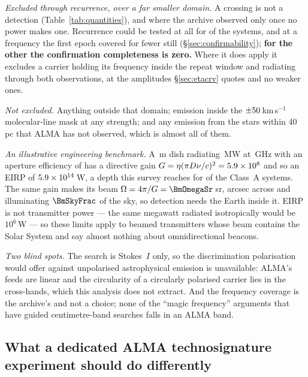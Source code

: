 \noindent\emph{Excluded through recurrence, over a far smaller domain.} A
crossing is not a detection (Table~\ref{tab:quantities}), and where the archive
observed only once no power makes one. Recurrence could be tested at all for
\ScSysIndep{} of the \NSysClassA{} systems, and at a frequency the first
epoch covered for fewer still (\S\ref{sec:confirmability}); \textbf{for the
other \ScSysNoConf{} the confirmation completeness is zero.} Where it does apply it excludes a carrier
holding its frequency inside the repeat window and radiating through both
observations, at the amplitudes \S\ref{sec:etacrv} quotes and no weaker ones.

\noindent\emph{Not excluded.} Anything outside that domain; emission inside
the $\pm50$\,km\,s$^{-1}$ molecular-line mask at any strength; and
any emission from the \NGaiaCensus{} stars within 40\,pc that ALMA has not
observed, which is almost all of them.

\noindent\emph{An illustrative engineering benchmark.} A \BenchDiam\,m dish
radiating \BenchPowerMW\,MW at \BenchFreqGHz\,GHz with an aperture efficiency
of \BenchEta{} has a directive gain $G=\eta(\pi D\nu/c)^{2}=5.9\times10^{8}$ and so
an EIRP of $5.9\times10^{14}$\,W, a depth this survey reaches for \BenchNSysA{} of
the \NSysClassA{} Class~A systems. The same gain makes its beam
$\Omega=4\pi/G=\BmOmegaSr$\,sr, \BmArcsec{} arcsec across and illuminating
$\BmSkyFrac$ of the sky, so detection needs the Earth inside it. EIRP is not
transmitter power --- the same megawatt radiated isotropically
would be $10^{6}$\,W --- so these limits apply to beamed transmitters whose
beam contains the Solar System and say almost nothing about omnidirectional
beacons.

\noindent\emph{Two blind spots.} The search is Stokes~$I$ only, so the
discrimination polarisation would offer against unpolarised astrophysical
emission is unavailable: ALMA's feeds are linear and the circularity of a
circularly polarised carrier lies in the cross-hands, which this analysis does
not extract. And the frequency coverage is the archive's and not a choice; none
of the ``magic frequency'' arguments that have guided centimetre-band searches
falls in an ALMA band.

\subsection{What a dedicated ALMA technosignature experiment should do
differently}
\label{sec:future}

